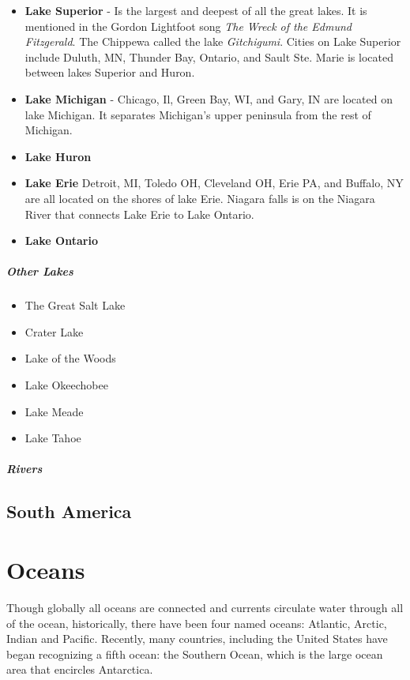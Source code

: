 				\begin{itemize}
					\item \textbf{Lake Superior} - Is the largest and deepest of all the great lakes.  It is mentioned in the Gordon Lightfoot song \textit{The Wreck of the Edmund Fitzgerald}.  The Chippewa called the lake \textit{Gitchigumi}.  Cities on Lake Superior include Duluth, MN, Thunder Bay, Ontario, and Sault Ste. Marie is located  between lakes Superior and Huron.  
					
					\item \textbf{Lake Michigan} - Chicago, Il, Green Bay, WI, and Gary, IN are located on lake Michigan.  It separates Michigan's upper peninsula from the rest of Michigan.  
					
					
					\item \textbf{Lake Huron}
					\item \textbf{Lake Erie}  Detroit, MI, Toledo OH, Cleveland OH, Erie PA, and Buffalo, NY are all located on the shores of lake Erie.  Niagara falls is on the Niagara River that connects Lake Erie to Lake Ontario.  
					
					\item \textbf{Lake Ontario}
				\end{itemize}
								
				\subparagraph{Other Lakes}
				\begin{itemize}
					
					\item{The Great Salt Lake}
					\item{Crater Lake}
					\item{Lake of the Woods}
					\item{Lake Okeechobee}
					\item{Lake Meade}
					\item{Lake Tahoe}
				\end{itemize}
				\subparagraph{Rivers}
		
			
	\subsection{South America}


	\section{Oceans}
		Though globally all oceans are connected and currents circulate water through all of the ocean, historically, there have been four named oceans: Atlantic, Arctic, Indian and Pacific. Recently, many countries, including the United States have began recognizing a fifth ocean: the Southern Ocean, which is the large ocean area that encircles Antarctica.  
